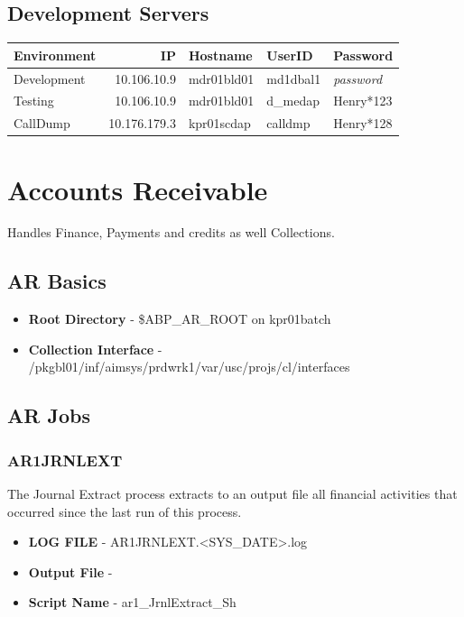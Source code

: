 \documentclass[12pt,twoside]{article}
\begin{document}
\subsection{Development Servers}
\label{sec-10-3}

\footnotesize

\begin{center}
\begin{tabular}{lrlll}
\hline
 \textbf{Environment}  &   \textbf{IP}  &  \textbf{Hostname}  &  \textbf{UserID}  &  \textbf{Password}  \\
\hline
 Development           &   10.106.10.9  &  mdr01bld01         &  md1dbal1         &  \emph{password}    \\
 Testing               &   10.106.10.9  &  mdr01bld01         &  d\_medap         &  Henry*123          \\
 CallDump              &  10.176.179.3  &  kpr01scdap         &  calldmp          &  Henry*128          \\
\hline
\end{tabular}
\end{center}



\newpage
\section{Accounts Receivable}
\label{sec-11}

  Handles Finance, Payments and credits as well Collections. 
\subsection{AR Basics}
\label{sec-11-1}

\begin{itemize}
\item \textbf{Root Directory} - \$ABP\_AR\_ROOT on kpr01batch
\item \textbf{Collection Interface} - /pkgbl01/inf/aimsys/prdwrk1/var/usc/projs/cl/interfaces
\end{itemize}
\subsection{AR Jobs}
\label{sec-11-2}
\subsubsection{AR1JRNLEXT}
\label{sec-11-2-1}

    The Journal Extract process extracts to an output file all financial activities that occurred since the last run of this process.
\begin{itemize}
\item \textbf{LOG FILE} - AR1JRNLEXT.<SYS\_DATE>.log
\item \textbf{Output File} -
\item \textbf{Script Name} - ar1\_JrnlExtract\_Sh
\end{itemize}
\end{document}
